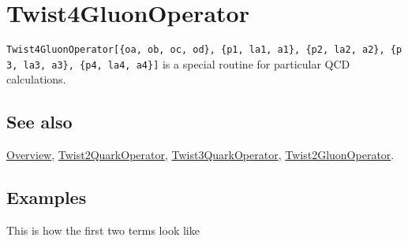 \documentclass[../FeynCalcManual.tex]{subfiles}
\begin{document}
\hypertarget{twist4gluonoperator}{
\section{Twist4GluonOperator}\label{twist4gluonoperator}}

\texttt{Twist4GluonOperator[\allowbreak{}\{\allowbreak{}oa,\ \allowbreak{}ob,\ \allowbreak{}oc,\ \allowbreak{}od\},\ \allowbreak{}\{\allowbreak{}p1,\ \allowbreak{}la1,\ \allowbreak{}a1\},\ \allowbreak{}\{\allowbreak{}p2,\ \allowbreak{}la2,\ \allowbreak{}a2\},\ \allowbreak{}\{\allowbreak{}p3,\ \allowbreak{}la3,\ \allowbreak{}a3\},\ \allowbreak{}\{\allowbreak{}p4,\ \allowbreak{}la4,\ \allowbreak{}a4\}]}
is a special routine for particular QCD calculations.

\subsection{See also}

\hyperlink{toc}{Overview},
\hyperlink{twist2quarkoperator}{Twist2QuarkOperator},
\hyperlink{twist3quarkoperator}{Twist3QuarkOperator},
\hyperlink{twist2gluonoperator}{Twist2GluonOperator}.

\subsection{Examples}

\begin{Shaded}
\begin{Highlighting}[]
\ExtensionTok{=}\OperatorTok{[\{}\OperatorTok{,}\OperatorTok{,}\OperatorTok{,}\OperatorTok{\},} \OperatorTok{\{}\OperatorTok{,}\OperatorTok{,}\OperatorTok{\},} \OperatorTok{\{}\OperatorTok{,}\OperatorTok{,}\OperatorTok{\},} 
    \OperatorTok{\{}\OperatorTok{,}\OperatorTok{,}\OperatorTok{\},} \OperatorTok{\{}\OperatorTok{,}\OperatorTok{,}\OperatorTok{\}]}\NormalTok{;}
\end{Highlighting}
\end{Shaded}

This is how the first two terms look like

\begin{Shaded}
\begin{Highlighting}[]
\OperatorTok{[[}\NormalTok{ ;; }\OperatorTok{]]}
\end{Highlighting}
\end{Shaded}
\end{document}

